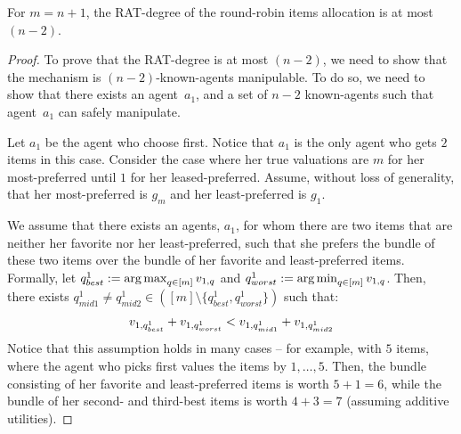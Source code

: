 \iffalse
\begin{claim}
    For $m = n+1$, the RAT-degree of the round-robin items allocation is at most $(n-2)$.
\end{claim}

\begin{proof}
    To prove that the RAT-degree is at most $(n-2)$, we need to show that the mechanism is $(n-2)$-known-agents manipulable.
    To do so, we need to show that there exists an agent~$a_1$, and a set of $n-2$ known-agents such that agent~$a_1$ can safely manipulate. 

    Let $a_1$ be the agent who choose first. Notice that $a_1$ is the only agent who gets $2$ items in this case. 
    Consider the case where her true valuations are $m$ for her most-preferred until $1$ for her leased-preferred. 
    Assume, without loss of generality, that her most-preferred is $g_m$ and her least-preferred is $g_1$.

    
    
    We assume that there exists an agents, $a_1$, for whom there are two items that are neither her favorite nor her least-preferred, such that she prefers the bundle of these two items over the bundle of her favorite and least-preferred items.
    Formally, let $q^1_{best} := \operatorname*{arg\,max}_{q\in [m]} v_{1,q}$ and $q^1_{worst} := \operatorname*{arg\,min}_{q\in [m]} v_{1,q}$. Then, there exists $q^1_{mid1} \neq q^1_{mid2} \in ([m] \setminus \{q^1_{best}, q^1_{worst}\})$ such that:
    \begin{align*}
        v_{1,q^1_{best}} + v_{1,q^1_{worst}} < v_{1,q^1_{mid1}} + v_{1,q^1_{mid2}}
    \end{align*}
    Notice that this assumption holds in many cases -- for example, with 
    $5$ items, where the agent who picks first values the items by $1, \ldots, 5$. Then, the bundle consisting of her favorite and least-preferred items is worth $5+1 =6$, while the bundle of her second- and third-best items is worth $4+3=7$ (assuming additive utilities).



    
    
    


\end{proof}
